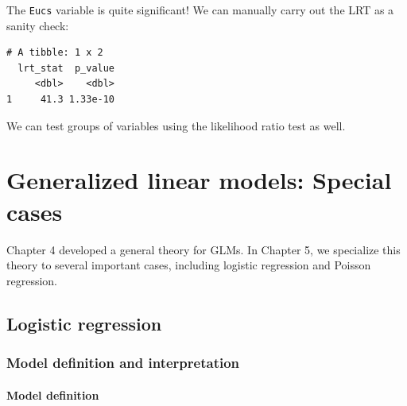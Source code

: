 \documentclass[
  11pt,
  letterpaper,
  oneside]{book}
\newenvironment{Shaded}{\begin{snugshade}}{\end{snugshade}}
\newcommand{\AttributeTok}[1]{\textcolor[rgb]{0.40,0.45,0.13}{#1}}
\newcommand{\ConstantTok}[1]{\textcolor[rgb]{0.56,0.35,0.01}{#1}}
\newcommand{\DecValTok}[1]{\textcolor[rgb]{0.68,0.00,0.00}{#1}}
\newcommand{\FunctionTok}[1]{\textcolor[rgb]{0.28,0.35,0.67}{#1}}
\newcommand{\NormalTok}[1]{\textcolor[rgb]{0.00,0.23,0.31}{#1}}
\newcommand{\OtherTok}[1]{\textcolor[rgb]{0.00,0.23,0.31}{#1}}
\newcommand{\SpecialCharTok}[1]{\textcolor[rgb]{0.37,0.37,0.37}{#1}}
\theoremstyle{plain}
\theoremstyle{plain}
\theoremstyle{definition}
\theoremstyle{definition}
\theoremstyle{plain}
\theoremstyle{remark}
\begin{document}
The \texttt{Eucs} variable is quite significant! We can manually carry
out the LRT as a sanity check:

\begin{Shaded}
\end{Shaded}

\begin{verbatim}
# A tibble: 1 x 2
  lrt_stat  p_value
     <dbl>    <dbl>
1     41.3 1.33e-10
\end{verbatim}

We can test groups of variables using the likelihood ratio test as well.

\part{Generalized linear models: Special cases}

Chapter 4 developed a general theory for GLMs. In Chapter 5, we
specialize this theory to several important cases, including logistic
regression and Poisson regression.

\hypertarget{sec-logistic-regression}{%
\chapter{Logistic regression}\label{sec-logistic-regression}}

\hypertarget{sec-logistic-model}{%
\section{Model definition and interpretation}\label{sec-logistic-model}}

\hypertarget{model-definition}{%
\subsection{Model definition}\label{model-definition}}
\end{document}
